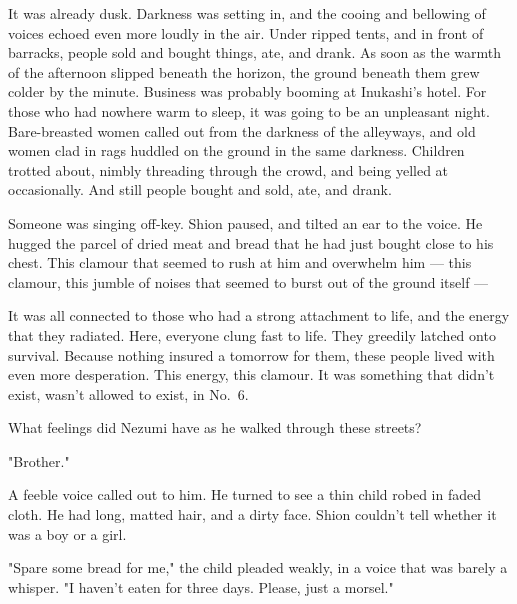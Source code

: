 It was already dusk. Darkness was setting in, and the cooing and
bellowing of voices echoed even more loudly in the air. Under ripped
tents, and in front of barracks, people sold and bought things, ate, and
drank. As soon as the warmth of the afternoon slipped beneath the
horizon, the ground beneath them grew colder by the minute. Business was
probably booming at Inukashi's hotel. For those who had nowhere warm to
sleep, it was going to be an unpleasant night. Bare-breasted women
called out from the darkness of the alleyways, and old women clad in
rags huddled on the ground in the same darkness. Children trotted about,
nimbly threading through the crowd, and being yelled at occasionally.
And still people bought and sold, ate, and drank.


\clearpage

Someone was singing off-key. Shion paused, and tilted an ear to the
voice. He hugged the parcel of dried meat and bread that he had just
bought close to his chest. This clamour that seemed to rush at him and
overwhelm him --- this clamour, this jumble of noises that seemed to burst
out of the ground itself ---

It was all connected to those who had a strong attachment to life, and
the energy that they radiated. Here, everyone clung fast to life. They
greedily latched onto survival. Because nothing insured a tomorrow for
them, these people lived with even more desperation. This energy, this
clamour. It was something that didn't exist, wasn't allowed to exist, in
No.~6.

What feelings did Nezumi have as he walked through these streets?

"Brother."

A feeble voice called out to him. He turned to see a thin child robed in
faded cloth. He had long, matted hair, and a dirty face. Shion couldn't
tell whether it was a boy or a girl.

"Spare some bread for me," the child pleaded weakly, in a voice that was
barely a whisper. "I haven't eaten for three days. Please, just a
morsel."

